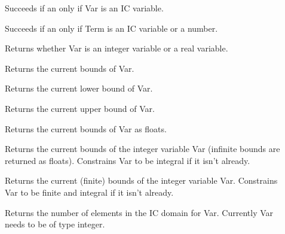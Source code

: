 \begin{description}

\item []
Succeeds if an only if Var is an IC variable.

\item []
Succeeds if an only if Term is an IC variable or a number.

\item []
Returns whether Var is an integer variable or a real variable.

\item []
Returns the current bounds of Var.

\item []
Returns the current lower bound of Var.

\item []
Returns the current upper bound of Var.

\item []
Returns the current bounds of Var as floats.

\item []
Returns the current bounds of the integer variable Var (infinite bounds are
returned as floats).  Constrains Var to be integral if it isn't already.

\item []
Returns the current (finite) bounds of the integer variable Var.  Constrains
Var to be finite and integral if it isn't already.

\item []
Returns the number of elements in the IC domain for Var. Currently Var
needs to be of type integer.


\end{description}
